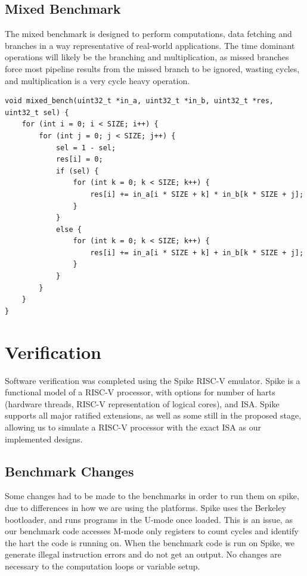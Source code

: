 \subsection{Mixed Benchmark}
The mixed benchmark is designed to perform computations, data fetching and branches in a way representative of real-world applications. The time dominant operations will likely be the branching and multiplication, as missed branches force most pipeline results from the missed branch to be ignored, wasting cycles, and multiplication is a very cycle heavy operation.

\begin{verbatim}
void mixed_bench(uint32_t *in_a, uint32_t *in_b, uint32_t *res, uint32_t sel) {
    for (int i = 0; i < SIZE; i++) {
        for (int j = 0; j < SIZE; j++) {
            sel = 1 - sel;
            res[i] = 0;
            if (sel) {
                for (int k = 0; k < SIZE; k++) {
                    res[i] += in_a[i * SIZE + k] * in_b[k * SIZE + j];
                }
            }
            else {
                for (int k = 0; k < SIZE; k++) {
                    res[i] += in_a[i * SIZE + k] + in_b[k * SIZE + j];
                }
            }
        }
    }
}
\end{verbatim}

\section{Verification}
Software verification was completed using the Spike RISC-V emulator\cite{spike}. Spike is a functional model of a RISC-V processor, with options for number of harts (hardware threads, RISC-V representation of logical cores), and ISA. Spike supports all major ratified extensions, as well as some still in the proposed stage, allowing us to simulate a RISC-V processor with the exact ISA as our implemented designs.

\subsection{Benchmark Changes}
Some changes had to be made to the benchmarks in order to run them on spike, due to differences in how we are using the platforms. Spike uses the Berkeley bootloader, and runs programs in the U-mode once loaded. This is an issue, as our benchmark code accesses M-mode only registers to count cycles and identify the hart the code is running on. When the benchmark code is run on Spike, we generate illegal instruction errors and do not get an output. No changes are necessary to the computation loops or variable setup.

